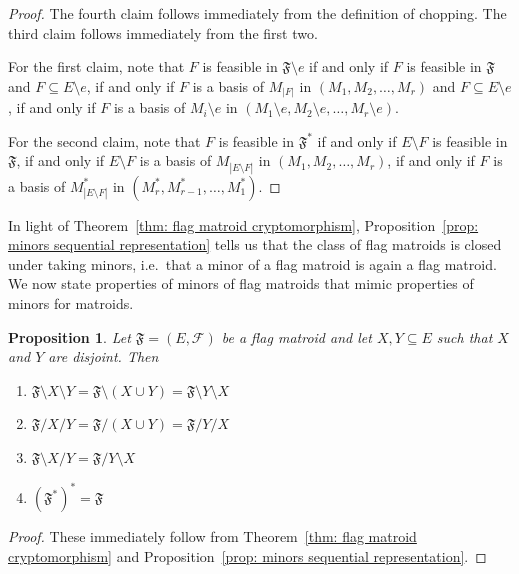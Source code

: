 \documentclass[12pt]{article}
\newtheorem{prop}[thm]{Proposition}
\theoremstyle{definition}
\begin{document}
\begin{proof}
    The fourth claim follows immediately from the definition of chopping.
    The third claim follows immediately from the first two.
    
    For the first claim, note that $F$ is feasible in $\mathfrak{F}\setminus e$ if and only if $F$ is feasible in $\mathfrak{F}$ and $F \subseteq E\setminus e$, if and only if $F$ is a basis of $M_{|F|}$ in $(M_1, M_2, \dots, M_r)$ and $F\subseteq E\setminus e$, if and only if $F$ is a basis of $M_i\setminus e$ in $(M_1\setminus e, M_2\setminus e, \dots, M_r\setminus e)$.

    For the second claim, note that $F$ is feasible in $\mathfrak{F}^*$ if and only if $E\setminus F$ is feasible in $\mathfrak{F}$, if and only if $E\setminus F$ is a basis of $M_{|E\setminus F|}$ in $(M_1, M_2, \dots, M_r)$, if and only if $F$ is a basis of $M_{|E\setminus F|}^*$ in $(M_r^*, M_{r-1}^*, \dots, M_1^*)$.
\end{proof}

In light of Theorem~\ref{thm: flag matroid cryptomorphism}, Proposition~\ref{prop: minors sequential representation} tells us that the class of flag matroids is closed under taking minors, i.e.~that a minor of a flag matroid is again a flag matroid. 
We now state properties of minors of flag matroids that mimic properties of minors for matroids.

\begin{prop}\label{prop: minors commute}
    Let $\mathfrak{F} = (E, \mathcal{F})$ be a flag matroid and let $X, Y \subseteq E$ such that $X$ and $Y$ are disjoint. Then
    \begin{enumerate}
        \item $\mathfrak{F}\setminus X \setminus Y = \mathfrak{F}\setminus (X \cup Y) = \mathfrak{F}\setminus Y \setminus X$
        \item $\mathfrak{F}/ X / Y = \mathfrak{F}/ (X \cup Y) = \mathfrak{F}/ Y /X$
        \item $\mathfrak{F}\setminus X / Y = \mathfrak{F}/ Y \setminus X$
        \item $(\mathfrak{F}^*)^* = \mathfrak{F}$
    \end{enumerate}
\end{prop}
\begin{proof}
    These immediately follow from Theorem~\ref{thm: flag matroid cryptomorphism} and Proposition~\ref{prop: minors sequential representation}.
\end{proof}
\end{document}
